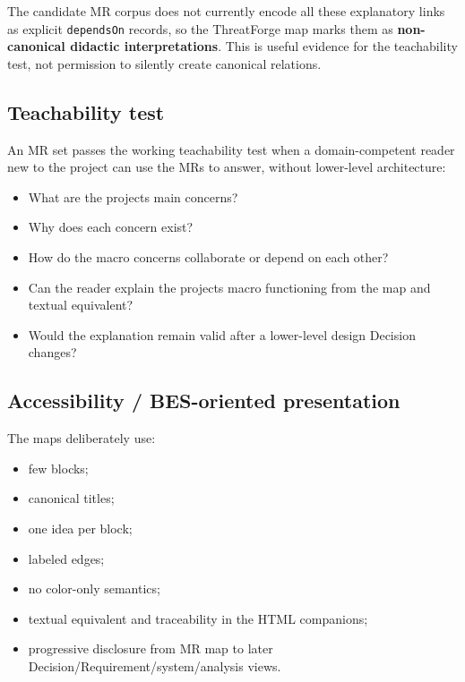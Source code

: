 \documentclass[
  10pt,
]{article}
\providecommand{\tightlist}{%
  \setlength{\itemsep}{0pt}\setlength{\parskip}{0pt}}
\begin{document}
The candidate MR corpus does not currently encode all these explanatory
links as explicit \texttt{dependsOn} records, so the ThreatForge map
marks them as \textbf{non-canonical didactic interpretations}. This is
useful evidence for the teachability test, not permission to silently
create canonical relations.

\subsection{Teachability test}\label{teachability-test}

An MR set passes the working teachability test when a domain-competent
reader new to the project can use the MRs to answer, without lower-level
architecture:

\begin{itemize}
\tightlist
\item
  What are the project\textquotesingle s main concerns?
\item
  Why does each concern exist?
\item
  How do the macro concerns collaborate or depend on each other?
\item
  Can the reader explain the project\textquotesingle s macro functioning
  from the map and textual equivalent?
\item
  Would the explanation remain valid after a lower-level design Decision
  changes?
\end{itemize}

\subsection{Accessibility / BES-oriented
presentation}\label{accessibility--bes-oriented-presentation}

The maps deliberately use:

\begin{itemize}
\tightlist
\item
  few blocks;
\item
  canonical titles;
\item
  one idea per block;
\item
  labeled edges;
\item
  no color-only semantics;
\item
  textual equivalent and traceability in the HTML companions;
\item
  progressive disclosure from MR map to later
  Decision/Requirement/system/analysis views.
\end{itemize}
\end{document}
